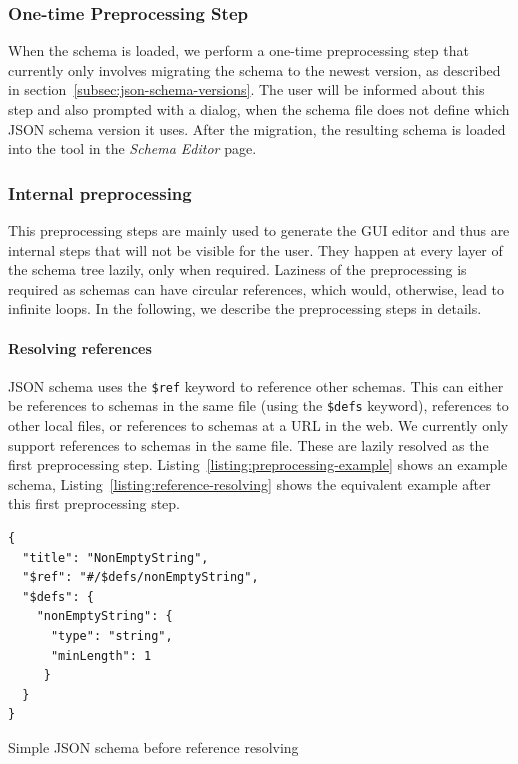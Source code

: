 \subsubsection{One-time Preprocessing Step}
When the schema is loaded, we perform a one-time preprocessing step that currently only involves migrating the schema to the newest version,
as described in section~\ref{subsec:json-schema-versions}.
The user will be informed about this step and also prompted with a dialog, when the schema file does not define which JSON schema version it uses.
After the migration, the resulting schema is loaded into the tool in the \textit{Schema Editor} page.


\subsubsection{Internal preprocessing}
This preprocessing steps are mainly used to generate the GUI editor and thus are internal steps that will not be visible for the user.
They happen at every layer of the schema tree lazily, only when required.
Laziness of the preprocessing is required as schemas can have circular references, which would, otherwise, lead to infinite loops.
In the following, we describe the preprocessing steps in details.

\paragraph{Resolving references}
JSON schema uses the \texttt{\$ref} keyword to reference other schemas.
This can either be references to schemas in the same file (using the \texttt{\$defs} keyword), references to other local files,
or references to schemas at a URL in the web.
We currently only support references to schemas in the same file.
These are lazily resolved as the first preprocessing step.
Listing~\ref{listing:preprocessing-example} shows an example schema, Listing~\ref{listing:reference-resolving} shows the equivalent example after
this first preprocessing step.

\begin{listing}[!h]
    \begin{verbatim}
{
  "title": "NonEmptyString",
  "$ref": "#/$defs/nonEmptyString",
  "$defs": {
    "nonEmptyString": {
      "type": "string",
      "minLength": 1
     }
  }
}
    \end{verbatim}
    \caption{Simple JSON schema before reference resolving}
    \label{listing:preprocessing-example}
\end{listing}

